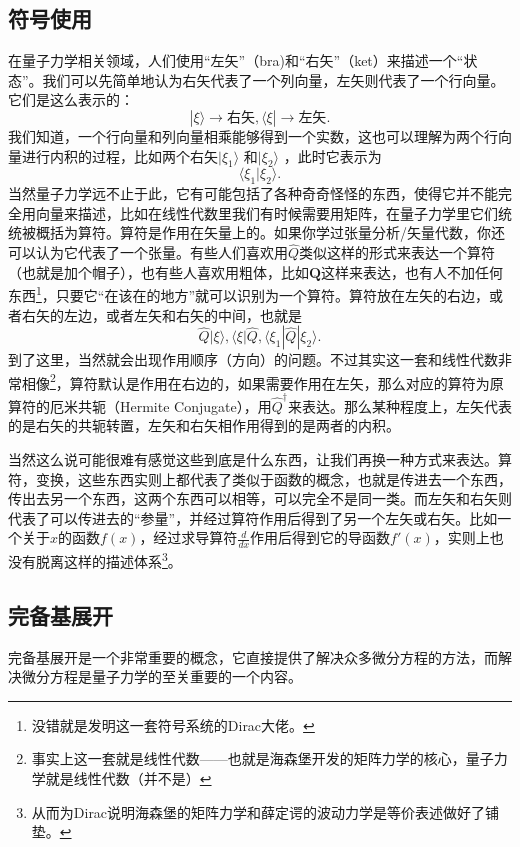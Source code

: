 \documentclass{article}
\numberwithin{equation}{section}
\begin{document}
    \subsection{符号使用}
    在量子力学相关领域，人们使用``左矢''（bra)和``右矢''（ket）来描述一个``状态''。我们可以先简单地认为右矢代表了一个列向量，左矢则代表了一个行向量。它们是这么表示的：
    \[
    | \xi \rangle \rightarrow \text{右矢}, \langle \xi | \rightarrow \text{左矢}    
    .\]  
    我们知道，一个行向量和列向量相乘能够得到一个实数，这也可以理解为两个行向量进行内积的过程，比如两个右矢$| \xi_1 \rangle $ 和$| \xi_2 \rangle $ ，此时它表示为
    \[
    \langle \xi_1 | \xi_2 \rangle 
    .\] 
    当然量子力学远不止于此，它有可能包括了各种奇奇怪怪的东西，使得它并不能完全用向量来描述，比如在线性代数里我们有时候需要用矩阵，在量子力学里它们统统被概括为算符。算符是作用在矢量上的。如果你学过张量分析/矢量代数，你还可以认为它代表了一个张量。有些人们喜欢用$\hat{Q}$类似这样的形式来表达一个算符（也就是加个帽子），也有些人喜欢用粗体，比如$\mathbf{Q}$这样来表达，也有人不加任何东西\footnote{没错就是发明这一套符号系统的\Large{Dirac}大佬。}，只要它``在该在的地方''就可以识别为一个算符。算符放在左矢的右边，或者右矢的左边，或者左矢和右矢的中间，也就是
    \[
    \hat{Q}| \xi \rangle ,\langle \xi | \hat{Q}, \langle \xi_1 | \hat{Q} | \xi_2 \rangle   
    .\] 
    到了这里，当然就会出现作用顺序（方向）的问题。不过其实这一套和线性代数非常相像\footnote{事实上这一套就是线性代数——也就是海森堡开发的矩阵力学的核心，量子力学就是线性代数（并不是）}，算符默认是作用在右边的，如果需要作用在左矢，那么对应的算符为原算符的厄米共轭（Hermite Conjugate），用$\hat{Q}^\dagger$来表达。那么某种程度上，左矢代表的是右矢的共轭转置，左矢和右矢相作用得到的是两者的内积。

    当然这么说可能很难有感觉这些到底是什么东西，让我们再换一种方式来表达。算符，变换，这些东西实则上都代表了类似于函数的概念，也就是传进去一个东西，传出去另一个东西，这两个东西可以相等，可以完全不是同一类。而左矢和右矢则代表了可以传进去的``参量''，并经过算符作用后得到了另一个左矢或右矢。比如一个关于$x$的函数$f(x)$，经过求导算符$\frac{d }{d x} $作用后得到它的导函数$f'(x)$，实则上也没有脱离这样的描述体系\footnote{从而为Dirac说明海森堡的矩阵力学和薛定谔的波动力学是等价表述做好了铺垫。}。

    \subsection{完备基展开}
    完备基展开是一个非常重要的概念，它直接提供了解决众多微分方程的方法，而解决微分方程是量子力学的至关重要的一个内容。
\end{document}
